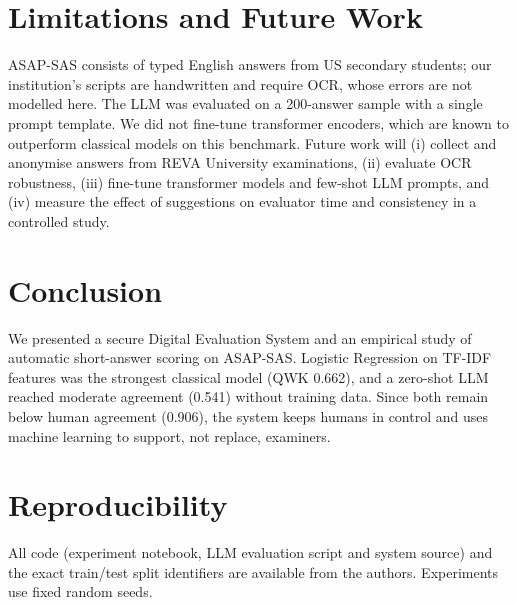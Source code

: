 \documentclass[conference]{IEEEtran}
\begin{document}
\section{Limitations and Future Work}
ASAP-SAS consists of typed English answers from US secondary students; our institution's scripts are handwritten and require OCR, whose errors are not modelled here. The LLM was evaluated on a 200-answer sample with a single prompt template. We did not fine-tune transformer encoders, which are known to outperform classical models on this benchmark. Future work will (i) collect and anonymise answers from REVA University examinations, (ii) evaluate OCR robustness, (iii) fine-tune transformer models and few-shot LLM prompts, and (iv) measure the effect of suggestions on evaluator time and consistency in a controlled study.

\section{Conclusion}
We presented a secure Digital Evaluation System and an empirical study of automatic short-answer scoring on ASAP-SAS. Logistic Regression on TF-IDF features was the strongest classical model (QWK 0.662), and a zero-shot LLM reached moderate agreement (0.541) without training data. Since both remain below human agreement (0.906), the system keeps humans in control and uses machine learning to support, not replace, examiners.

\section*{Reproducibility}
All code (experiment notebook, LLM evaluation script and system source) and the exact train/test split identifiers are available from the authors. Experiments use fixed random seeds.
\end{document}

